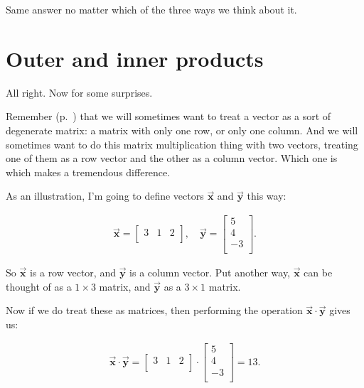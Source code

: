 Same answer no matter which of the three ways we think about it.

\section{Outer and inner products}

All right. Now for some surprises.


Remember (p.~\pageref{rowAndColVectors}) that we will sometimes want to treat a
vector as a sort of degenerate matrix: a matrix with only one row, or only one
column. And we will sometimes want to do this matrix multiplication thing with
two vectors, treating one of them as a row vector and the other as a column
vector. Which one is which makes a tremendous difference.

As an illustration, I'm going to define vectors $\overrightarrow{\textbf{x}}$
and $\overrightarrow{\textbf{y}}$ this way:

\vspace{-.15in}
\begin{align*}
\overrightarrow{\textbf{x}} =
\begin{bmatrix}
3 & 1 & 2 \\
\end{bmatrix}, \quad 
\overrightarrow{\textbf{y}} =
\begin{bmatrix}
5 \\  4 \\ -3 \\
\end{bmatrix}.
\end{align*}
\vspace{-.15in}

So $\overrightarrow{\textbf{x}}$ is a row vector, and
$\overrightarrow{\textbf{y}}$ is a column vector. Put another way,
$\overrightarrow{\textbf{x}}$ can be thought of as a $1\times 3$ matrix, and
$\overrightarrow{\textbf{y}}$ as a $3\times 1$ matrix.

Now if we do treat these as matrices, then performing the operation
$\overrightarrow{\textbf{x}} \cdot \overrightarrow{\textbf{y}}$ gives us:

\vspace{-.15in}
\begin{align*}
\overrightarrow{\textbf{x}} \cdot \overrightarrow{\textbf{y}} =
\begin{bmatrix}
3 & 1 & 2 \\
\end{bmatrix} \cdot
\begin{bmatrix}
5 \\ 4 \\ -3 \\
\end{bmatrix} = 13.
\end{align*}
\vspace{-.15in}

